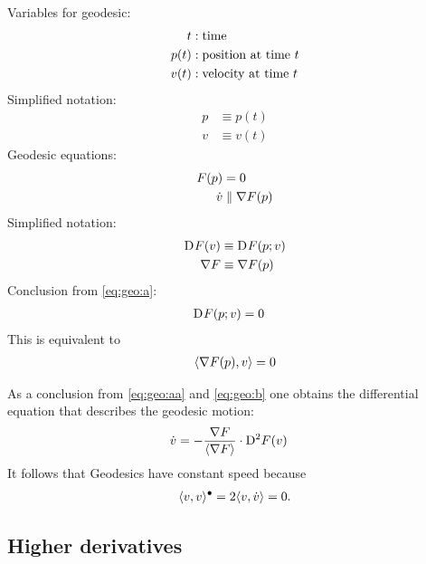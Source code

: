 Variables for geodesic:
\begin{subequations}
\begin{align}
t  &:  \text{time}\\
p( t )  &:  \text{position at time $ t $}\\
v( t )  &:  \text{velocity at time $ t $}
\end{align}
\end{subequations}
Simplified notation:
\begin{subequations}
\begin{align}
p  &\equiv  p( t )\\
v  &\equiv  v( t )
\end{align}
\end{subequations}
Geodesic equations:
\begin{subequations}
\label{eq:geo}
\begin{align}
F( p )  &=  0
\label{eq:geo:a}\\
\dot{ v }  &\parallel  \nabla F ( p )
\label{eq:geo:b}
\end{align}
\end{subequations}
Simplified notation:
\begin{subequations}
\begin{align}
\mathrm{D}^{  } F ( v )  &\equiv  \mathrm{D}^{  } F ( p; v )\\
\nabla F          &\equiv  \nabla F ( p )
\end{align}
\end{subequations}
Conclusion from \eqref{eq:geo:a}:
\begin{align}
\mathrm{D}^{  } F ( p; v )  &=  0
\label{eq:geo:aa}
\end{align}
This is equivalent to
\begin{align}
\langle  \nabla F ( p ) ,  v  \rangle  =  0
\end{align}

As a conclusion from \eqref{eq:geo:aa} and \eqref{eq:geo:b}
one obtains the differential equation that describes the geodesic motion:
\begin{align}
    \dot{ v }   &=
    - \frac{ \nabla F  }{ \langle  \nabla F   \rangle }  \cdot
    \mathrm{D}^{  2  } F ( v )
    \label{def:cf}
\end{align}
It follows that Geodesics have constant speed because
\begin{align}
    \langle  v ,  v  \rangle^\bullet  =  2 \langle  v ,  \dot{ v }  \rangle  =  0 .
\end{align}


\subsection{Higher derivatives}


